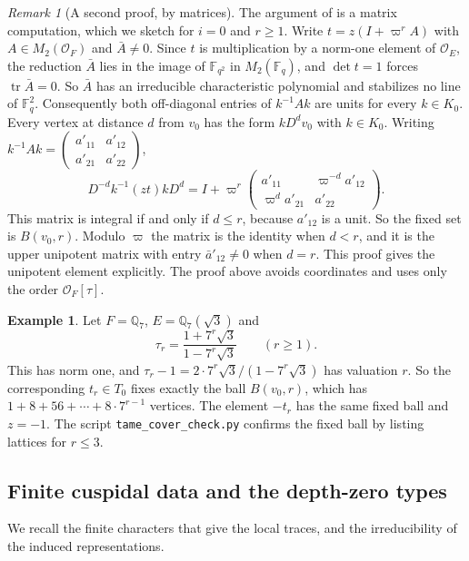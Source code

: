 \documentclass[12pt,letterpaper]{article}
\numberwithin{equation}{section}
\theoremstyle{definition}
\newtheorem{example}[theorem]{Example}
\theoremstyle{remark}
\newtheorem{remark}[theorem]{Remark}
\newcommand{\OO}{\mathcal O_F}
\newcommand{\OEr}{\mathcal O_E}
\newcommand{\kk}{\mathbb F_q}
\newcommand{\tr}{\operatorname{tr}}
\newcommand{\sm}[4]{\left(\begin{smallmatrix}#1&#2\\#3&#4\end{smallmatrix}\right)}
\begin{document}
\begin{remark}[A second proof, by matrices]\label{rem:ballmatrix}
The argument of \cite{Jo26a} is a matrix computation, which we sketch for $i=0$ and $r\ge1$. Write $t=z(I+\varpi^rA)$ with $A\in M_2(\OO)$ and $\bar A\ne0$. Since $t$ is multiplication by a norm-one element of $\OEr$, the reduction $\bar A$ lies in the image of $\mathbb F_{q^2}$ in $M_2(\kk)$, and $\det t=1$ forces $\tr\bar A=0$. So $\bar A$ has an irreducible characteristic polynomial and stabilizes no line of $\kk^2$. Consequently both off-diagonal entries of $k^{-1}Ak$ are units for every $k\in K_0$. Every vertex at distance $d$ from $v_0$ has the form $kD^dv_0$ with $k\in K_0$. Writing $k^{-1}Ak=\sm{a'_{11}}{a'_{12}}{a'_{21}}{a'_{22}}$,
\[
 D^{-d}k^{-1}(zt)kD^{d}=I+\varpi^r\sm{a'_{11}}{\varpi^{-d}a'_{12}}{\varpi^{d}a'_{21}}{a'_{22}} .
\]
This matrix is integral if and only if $d\le r$, because $a'_{12}$ is a unit. So the fixed set is $B(v_0,r)$. Modulo $\varpi$ the matrix is the identity when $d<r$, and it is the upper unipotent matrix with entry $\bar a'_{12}\ne0$ when $d=r$. This proof gives the unipotent element explicitly. The proof above avoids coordinates and uses only the order $\OO[\tau]$.
\end{remark}

\begin{example}\label{ex:tr}
Let $F=\mathbb Q_7$, $E=\mathbb Q_7(\sqrt3)$ and
\[
 \tau_r=\frac{1+7^r\sqrt3}{1-7^r\sqrt3}\qquad(r\ge1).
\]
This has norm one, and $\tau_r-1=2\cdot7^r\sqrt3/(1-7^r\sqrt3)$ has valuation $r$. So the corresponding $t_r\in T_0$ fixes exactly the ball $B(v_0,r)$, which has $1+8+56+\cdots+8\cdot7^{r-1}$ vertices. The element $-t_r$ has the same fixed ball and $z=-1$. The script \texttt{tame\_cover\_check.py} confirms the fixed ball by listing lattices for $r\le3$.
\end{example}

\subsection*{Finite cuspidal data and the depth-zero types}
We recall the finite characters that give the local traces, and the irreducibility of the induced representations.
\end{document}
